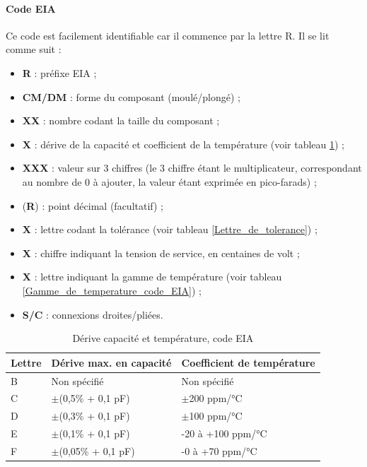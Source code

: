 \documentclass[a4paper]{article}
\begin{document}
\paragraph{Code \ac{EIA}}

Ce code est facilement identifiable car il commence par la lettre \og{}R\fg{}. Il se lit comme suit :

\begin{itemize}
	\item \textbf{R} : préfixe \ac{EIA} ;
	\item \textbf{CM/DM} : forme du composant (moulé/plongé) ;
	\item \textbf{XX} : nombre codant la taille du composant ;
	\item \textbf{X} : dérive de la capacité et coefficient de la température (voir tableau \ref{Derive_capacite_et_temperature_code_EIA}) ;
	\item \textbf{XXX} : valeur sur 3 chiffres (le 3\ieme{} chiffre étant le multiplicateur, correspondant au nombre de 0 à ajouter, la valeur étant exprimée en pico-farads) ;
	\item (\textbf{R}) : point décimal (facultatif) ;
	\item \textbf{X} : lettre codant la tolérance (voir tableau \ref{Lettre_de_tolerance}) ;
	\item \textbf{X} : chiffre indiquant la tension de service, en centaines de volt ;
	\item \textbf{X} : lettre indiquant la gamme de température (voir tableau \ref{Gamme_de_temperature_code_EIA}) ;
	\item \textbf{S/C} : connexions droites/pliées.
\end{itemize}

\begin{table}[H]
	\centering
		\begin{tabular}{|l|l|l|}\hline
				Lettre & Dérive max. en capacité & Coefficient de température\\\hline\hline
				B	& Non spécifié & Non spécifié\\\hline
				C	& $\pm$(0,5\% + 0,1 pF) & $\pm$200 ppm/°C\\\hline
				D	& $\pm$(0,3\% + 0,1 pF) & $\pm$100 ppm/°C\\\hline
				E	& $\pm$(0,1\% + 0,1 pF) & -20 à +100 ppm/°C\\\hline
				F	& $\pm$(0,05\% + 0,1 pF) & -0 à +70 ppm/°C\\\hline
		\end{tabular}
	\caption{Dérive capacité et température, code \ac{EIA}
		\label{Derive_capacite_et_temperature_code_EIA}}
\end{table}
\end{document}
